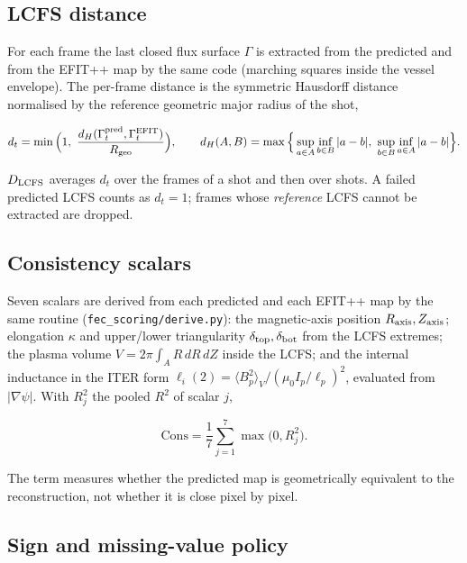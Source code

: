\documentclass[11pt,a4paper]{article}
\numberwithin{equation}{section}
\begin{document}
\hypertarget{lcfs-distance}{%
\subsection{LCFS distance}\label{lcfs-distance}}

For each frame the last closed flux surface \(\Gamma\) is extracted from the predicted and from the EFIT++ map by the same code (marching squares inside the vessel envelope). The per-frame distance is the symmetric Hausdorff distance \cite{huttenlocher1993} normalised by the reference geometric major radius of the shot,

\[
d_t = \min\Big(1,\ \frac{d_H(\Gamma^{\rm pred}_t,\Gamma^{\rm EFIT}_t)}{R_{\rm geo}}\Big),\qquad
d_H(A,B)=\max\Big\{\sup_{a\in A}\inf_{b\in B}|a-b|,\ \sup_{b\in B}\inf_{a\in A}|a-b|\Big\}.
\]

\(D_{\rm LCFS}\) averages \(d_t\) over the frames of a shot and then over shots. A failed predicted LCFS counts as \(d_t=1\); frames whose \emph{reference} LCFS cannot be extracted are dropped.

\hypertarget{consistency-scalars}{%
\subsection{Consistency scalars}\label{consistency-scalars}}

Seven scalars are derived from each predicted and each EFIT++ map by the same routine (\nolinkurl{fec_scoring/derive.py}): the magnetic-axis position \(R_{\rm axis}, Z_{\rm axis}\); elongation \(\kappa\) and upper/lower triangularity \(\delta_{\rm top},\delta_{\rm bot}\) from the LCFS extremes; the plasma volume \(V = 2\pi\int_A R\,dR\,dZ\) inside the LCFS; and the internal inductance in the ITER form \(\ell_i(2)=\langle B_p^{2}\rangle_V/(\mu_0I_p/\ell_p)^{2}\), evaluated from \(|\nabla\psi|\). With \(R^2_j\) the pooled \(R^2\) of scalar \(j\),

\[
\mathrm{Cons} = \frac17\sum_{j=1}^{7}\max\big(0,R^2_j\big).
\]

The term measures whether the predicted map is geometrically equivalent to the reconstruction, not whether it is close pixel by pixel.

\hypertarget{sign-and-missing-value-policy}{%
\subsection{Sign and missing-value policy}\label{sign-and-missing-value-policy}}
\end{document}

